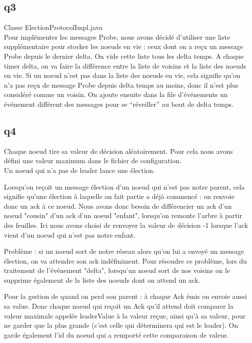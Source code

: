 \documentclass[paper=a4, fontsize=11pt]{report} %
\begin{document}
\subsection{q3}
Classe ElectionProtocolImpl.java \\
Pour implémenter les messages Probe, nous avons décidé d'utiliser une liste supplémentaire pour stocker les noeuds en vie : ceux dont on a reçu un message Probe depuis le dernier delta. On vide cette liste tous les delta temps.
A chaque timer delta, on va faire la différence entre la liste de voisins et la liste des noeuds en vie. Si un noeud n'est pas dans la liste des noeuds en vie, cela signifie qu'on n'a pas reçu de message Probe depuis delta temps au moins, donc il n'est plus considéré comme un voisin.
On ajoute ensuite dans la file d'événements un événement différent des messages pour se \enquote{réveiller} au bout de delta temps.


\subsection{q4}
Chaque noeud tire sa valeur de décision aléatoirement. Pour cela nous avons défini une valeur maximum dans le fichier de configuration.\\
Un noeud qui n'a pas de leader lance une élection.

Lorsqu'on reçoit un message élection d'un noeud qui n'est pas notre parent, cela signifie qu'une élection à laquelle on fait partie a déjà commencé : on renvoie donc un ack à ce noeud.
Nous avons donc besoin de différencier un ack d'un noeud "cousin" d'un ack d'un noeud "enfant", lorsqu'on remonte l'arbre à partir des feuilles.
Ici nous avons choisi de renvoyer la valeur de décision -1 lorsque l'ack vient d'un noeud qui n'est pas notre enfant. 

Problème : si un noeud sort de notre réseau alors qu'on lui a envoyé un message élection, on va attendre son ack indéfiniment. 
Pour résoudre ce problème, lors du traitement de l'événement "delta", lorsqu'un noeud sort de nos voisins on le supprime également de la liste des noeuds dont on attend un ack.

Pour la gestion de quand on perd son parent : à chaque Ack émis on envoie aussi sa value. Donc chaque noeud qui reçoit un Ack qu'il attend doit comparer la valeur maximale appelée leaderValue à la valeur reçue, ainsi qu'à sa valeur, pour ne garder que la plus grande (c'est celle qui déterminera qui est le leader). On garde également l'id du noeud qui a remporté cette comparaison de valeur.
\end{document}

